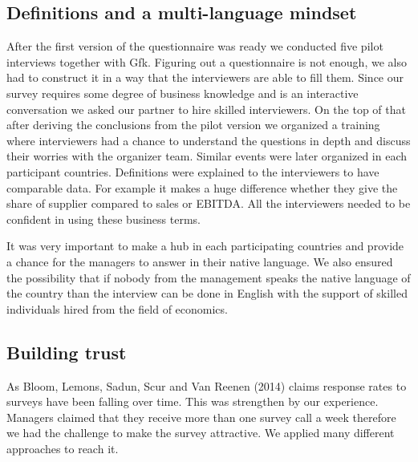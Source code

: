 \documentclass[final, dvipsnames, authoryear,12pt]{elsarticle}
\begin{document}
\subsection{Definitions and a multi-language mindset}

After the first version of the questionnaire was ready we conducted five pilot interviews together with Gfk. Figuring out a questionnaire is not enough, we also had to construct it in a way that the interviewers are able to fill them. Since our survey requires some degree of business knowledge and is an interactive conversation we asked our partner to hire skilled interviewers. On the top of that after deriving the conclusions from the pilot version we organized a training where interviewers had a chance to understand the questions in depth and discuss their worries with the organizer team. Similar events were later organized in each participant countries. Definitions were explained to the interviewers to have comparable data. For example it makes a huge difference whether they give the share of supplier compared to sales or EBITDA. All the interviewers needed to be confident in using these business terms.

It was very important to make a hub in each participating countries and provide a chance for the managers to answer in their native language. We also ensured the possibility that if nobody from the management speaks the native language of the country than the interview can be done in English with the support of skilled individuals hired from the field of economics.

\subsection{Building trust}

As Bloom, Lemons, Sadun, Scur and Van Reenen (2014) claims response rates to surveys have been falling over time. This was strengthen by our experience. Managers claimed that they receive more than one survey call a week therefore we had the challenge to make the survey attractive. We applied many different approaches to reach it.
\end{document}
